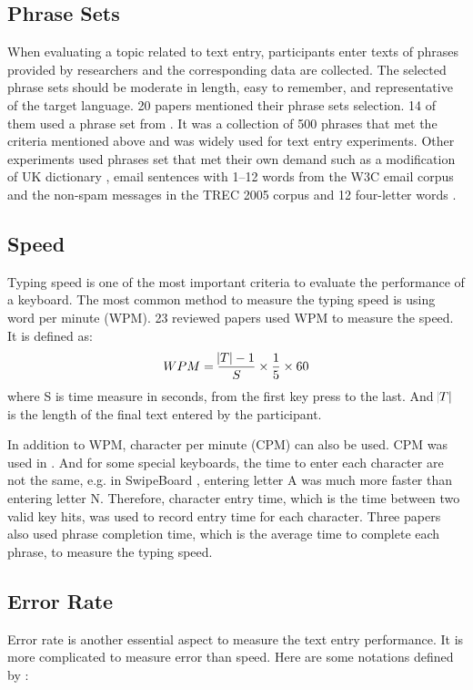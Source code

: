 \documentclass[11pt]{article}
\begin{document}
\subsection{Phrase Sets}
When evaluating a topic related to text entry, participants enter texts of phrases provided by researchers and the corresponding data are collected. The selected phrase sets should be moderate in length, easy to remember, and representative of the target language. 20 papers mentioned their phrase sets selection. 14 of them used a phrase set from \citep{10.1145/765891.765971}. It was a collection of 500 phrases that met the criteria mentioned above and was widely used for text entry experiments. Other experiments used phrases set that met their own demand such as a modification of UK dictionary \citep{6926662}, email sentences with 1–12 words from the W3C email corpus and the non-spam messages in the TREC 2005 corpus \citep{10.1145/2702123.2702135} and 12 four-letter words \citep{10.1145/2642918.2647354}.

\subsection{Speed}
Typing speed is one of the most important criteria to evaluate the performance of a keyboard. The most common method to measure the typing speed is using word per minute (WPM). 23 reviewed papers used WPM to measure the speed. It is defined as: $$WPM=\frac{\abs{T}-1}{S}\times \frac{1}{5}\times 60$$ where S is time measure in seconds, from the first key press to the last. And $\abs{T}$ is the length of the final text entered by the participant.

In addition to WPM, character per minute (CPM) can also be used. CPM was used in \citep{10.1145/1753326.1753367}. And for some special keyboards, the time to enter each character are not the same, e.g. in SwipeBoard \citep{10.1145/2642918.2647354}, entering letter A was much more faster than entering letter N. Therefore, character entry time, which is the time between two valid key hits, was used to record entry time for each character. Three papers \citep{10.1145/1357054.1357300, 6926662, 10.1145/1753326.1753367} also used phrase completion time, which is the average time to complete each phrase, to measure the typing speed.

\subsection{Error Rate}
Error rate is another essential aspect to measure the text entry performance. It is more complicated to measure error than speed. Here are some notations defined by \citep{10.1145/642611.642632}:
\end{document}
